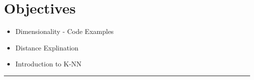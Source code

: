 \section*{Objectives}
\begin{itemize}
  \item Dimensionality - Code Examples
  \item Distance Explination
  \item Introduction to K-NN
  \end{itemize}

\rule[0.0051in]{\textwidth}{0.00025in}

